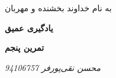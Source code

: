 \documentclass{article}
\begin{document}
\begin{titlepage}
	\centering
	{\scshape\LARGE به نام خداوند بخشنده و مهربان \par}
	\vspace{2cm}
	{\huge\bfseries یادگیری عمیق\par}
	\vspace{3cm}
	{\Large\bfseries  تمرین پنجم \par}
	\vspace{3cm}
	{\Large\itshape 		محسن نقی‌پورفر		94106757\par}
	\vspace{0.25cm}
	\vfill
	\end{titlepage}

\section{}
\subsection{}
\end{document}

